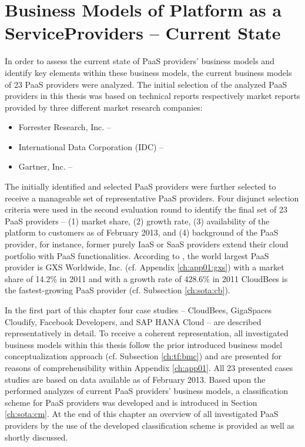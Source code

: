 \chapter[Business Models of Platform as a Service Providers -- Current State]{Business Models of Platform as a Service\protect\linebreak Providers -- Current State}\label{ch:sota}

In order to assess the current state of \ac{PaaS} providers' business models and identify key elements within these business models, the current business models of 23 \ac{PaaS} providers were analyzed. The initial selection of the analyzed \ac{PaaS} providers in this thesis was based on technical reports respectively market reports provided by three different market research companies:
\begin{itemize}[parsep=0pt, topsep=0pt, itemsep=0pt]
	\item Forrester Research, Inc. -- \citet{Rymer2011,Ried2011a}
	\item International Data Corporation (IDC) -- \citet{Bradshaw2012,Hendrick2012, Hendrick2012a}
	\item Gartner, Inc. -- \citet{Smith2012}
\end{itemize}
The initially identified and selected \ac{PaaS} providers were further selected to receive a manageable set of representative \ac{PaaS} providers. Four disjunct selection criteria were used in the second evaluation round to identify the final set of 23 \ac{PaaS} providers -- (1) market share, (2) growth rate, (3) availability of the platform to customers as of February 2013, and (4) background of the \ac{PaaS} provider, for instance, former purely \ac{IaaS} or \ac{SaaS} providers extend their cloud portfolio with \ac{PaaS} functionalities. According to \citet{Hendrick2012}, the world largest \ac{PaaS} provider is GXS Worldwide, Inc. (cf. Appendix \ref{ch:app01:gxs}) with a market share of 14.2\% in 2011 and with a growth rate of 428.6\% in 2011 CloudBees  is the fastest-growing \ac{PaaS} provider (cf. Subsection \ref{ch:sota:cb}).

In the first part of this chapter four case studies -- CloudBees, GigaSpaces Cloudify, Facebook Developers, and SAP HANA Cloud -- are described representatively in detail. To receive a coherent representation, all investigated business models within this thesis follow the prior introduced business model conceptualization approach (cf. Subsection \ref{ch:tf:bmc}) and are presented for reasons of comprehensibility within Appendix \ref{ch:app01}. All 23 presented cases studies are based on data available as of February 2013. Based upon the performed analyzes of current \ac{PaaS} providers' business models, a classification scheme for \ac{PaaS} providers was developed and is introduced in Section \ref{ch:sota:cm}. At the end of this chapter an overview of all investigated \ac{PaaS} providers by the use of the developed classification scheme is provided as well as shortly discussed.

